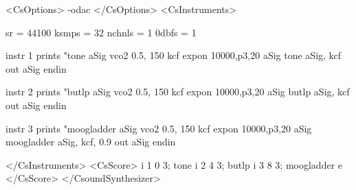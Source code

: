<CsOptions>
-odac
</CsOptions>
<CsInstruments>

sr = 44100
ksmps = 32
nchnls = 1
0dbfs = 1

  instr 1
        prints       "tone%
aSig    vco2         0.5, 150    
kcf     expon        10000,p3,20 
aSig    tone         aSig, kcf   
        out          aSig        
  endin

  instr 2
        prints       "butlp%
aSig    vco2         0.5, 150    
kcf     expon        10000,p3,20 
aSig    butlp        aSig, kcf   
        out          aSig       
  endin

  instr 3
        prints       "moogladder%
aSig    vco2         0.5, 150      
kcf     expon        10000,p3,20   
aSig    moogladder   aSig, kcf, 0.9
        out          aSig        
  endin

</CsInstruments>
<CsScore>
i 1 0  3; tone
i 2 4  3; butlp
i 3 8  3; moogladder
e
</CsScore>
</CsoundSynthesizer>